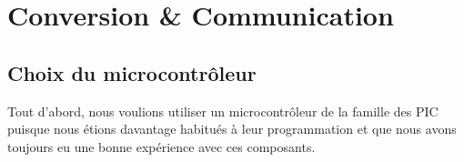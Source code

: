\documentclass[11pt, french]{article} %
\begin{document}
\section{Conversion \& Communication}
\subsection{Choix du microcontrôleur}

Tout d'abord, nous voulions utiliser un microcontrôleur de la famille des PIC puisque nous étions davantage habitués à leur programmation et que nous avons toujours eu une bonne expérience avec ces composants.  %
%
%
%
%
%
%


\end{document}
